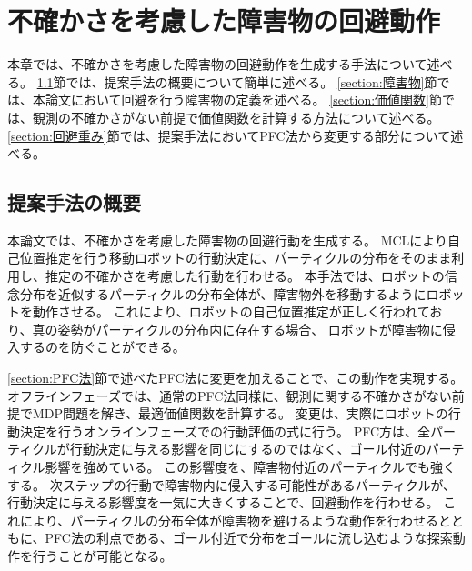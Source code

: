 \chapter{不確かさを考慮した障害物の回避動作} \label{chapter:method}
本章では、不確かさを考慮した障害物の回避動作を生成する手法について述べる。
\ref{section:method overview}節では、提案手法の概要について簡単に述べる。
\ref{section:障害物}節では、本論文において回避を行う障害物の定義を述べる。
\ref{section:価値関数}節では、観測の不確かさがない前提で価値関数を計算する方法について述べる。
\ref{section:回避重み}節では、提案手法においてPFC法から変更する部分について述べる。


\section{提案手法の概要} \label{section:method overview}
本論文では、不確かさを考慮した障害物の回避行動を生成する。
MCLにより自己位置推定を行う移動ロボットの行動決定に、パーティクルの分布をそのまま利用し、推定の不確かさを考慮した行動を行わせる。
本手法では、ロボットの信念分布を近似するパーティクルの分布全体が、障害物外を移動するようにロボットを動作させる。
これにより、ロボットの自己位置推定が正しく行われており、真の姿勢がパーティクルの分布内に存在する場合、
ロボットが障害物に侵入するのを防ぐことができる。



\ref{section:PFC法}節で述べたPFC法に変更を加えることで、この動作を実現する。
オフラインフェーズでは、通常のPFC法同様に、観測に関する不確かさがない前提でMDP問題を解き、最適価値関数を計算する。
変更は、実際にロボットの行動決定を行うオンラインフェーズでの行動評価の式に行う。
PFC方は、全パーティクルが行動決定に与える影響を同じにするのではなく、ゴール付近のパーティクル影響を強めている。
この影響度を、障害物付近のパーティクルでも強くする。
次ステップの行動で障害物内に侵入する可能性があるパーティクルが、行動決定に与える影響度を一気に大きくすることで、回避動作を行わせる。
これにより、パーティクルの分布全体が障害物を避けるような動作を行わせるとともに、PFC法の利点である、ゴール付近で分布をゴールに流し込むような探索動作を行うことが可能となる。


